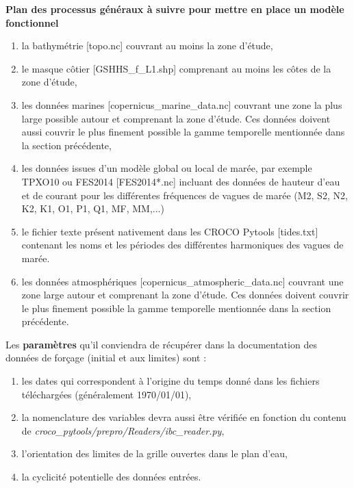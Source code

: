 \documentclass[10pt,a4paper,titlepage]{article}
\begin{document}
\begin{processEnv}{\textbf{Plan des processus généraux à suivre pour mettre en place un modèle fonctionnel}}
        \begin{enumerate}
            \item la bathymétrie {\color{darkgrey}[topo.nc]} couvrant au moins la zone d'étude,
            \item le masque côtier {\color{darkgrey}[GSHHS\_f\_L1.shp]} comprenant au moins les côtes de la zone d'étude,
            \item les données marines {\color{darkgrey}[copernicus\_marine\_data.nc]} couvrant une zone la plus large possible autour et comprenant la zone d'étude. Ces données doivent aussi couvrir le plus finement possible la gamme temporelle mentionnée dans la section précédente,
            \item les données issues d'un modèle global ou local de marée, par exemple TPXO10 ou FES2014 {\color{darkgrey}[FES2014*.nc]} incluant des données de hauteur d'eau et de courant pour les différentes fréquences de vagues de marée (M2, S2, N2, K2, K1, O1, P1, Q1, MF, MM,...)
            \item le fichier texte présent nativement dans les CROCO Pytools {\color{darkgrey}[tides.txt]} contenant les noms et les périodes des différentes harmoniques des vagues de marée.
            \item les données atmosphériques {\color{darkgrey}[copernicus\_atmospheric\_data.nc]} couvrant une zone large autour et comprenant la zone d'étude. Ces données doivent couvrir le plus finement possible la gamme temporelle mentionnée dans la section précédente.
        \end{enumerate}
        
        Les {\color{paramColor}\textbf{paramètres}} qu'il conviendra de récupérer dans la documentation des données de forçage (initial et aux limites) sont :
        
        \begin{enumerate}
            \item les dates qui correspondent à l'origine du temps donné dans les fichiers téléchargées (généralement 1970/01/01),
            \item la nomenclature des variables devra aussi être vérifiée en fonction du contenu de \textit{croco\_pytools/prepro/Readers/ibc\_reader.py},
            \item l'orientation des limites de la grille ouvertes dans le plan d'eau,
            \item la cyclicité potentielle des données entrées.
        \end{enumerate}
        

\end{processEnv}
\end{document}
